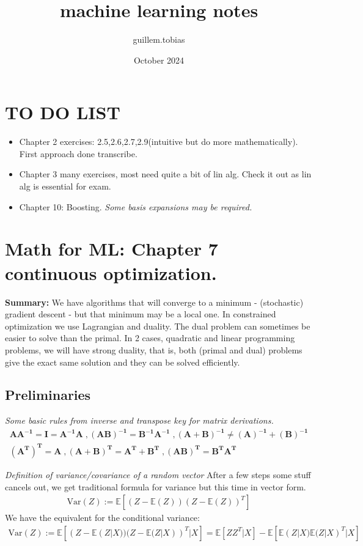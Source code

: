 \documentclass{article}
\begin{document}
\title{machine learning notes}
\author{guillem.tobias }
\date{October 2024}


\maketitle
\section{TO DO LIST}
\begin{itemize}
    \item Chapter 2 exercises: 2.5,2.6,2.7,2.9(intuitive but do more mathematically). First approach done transcribe.
    \item Chapter 3 many exercises, most need quite a bit of lin alg. Check it out as lin alg is essential for exam. 
    \item Chapter 10: Boosting. \textit{Some basis expansions may be required.}
\end{itemize}

\section*{Math for ML: Chapter 7 continuous optimization.}
\textbf{Summary:} We have algorithms that will converge to a minimum - (stochastic) gradient descent - but that minimum may be a local one. 
In constrained optimization we use Lagrangian and duality. The dual problem can sometimes be easier to solve than the primal. 
In 2 cases, quadratic and linear programming problems, we will have strong duality, that is, both (primal and dual) problems give 
the exact same solution and they can be solved efficiently.  

\subsection*{Preliminaries}
\textit{Some basic rules from inverse and transpose key for matrix derivations.}
\begin{align*}
\mathbf{A A^{-1} = I = A^{-1} A \;, (AB)^{-1} = B^{-1}A^{-1} \;, (A + B)^{-1} \neq (A)^{-1} + (B)^{-1}}
\\
\mathbf{(A^T)^T = A \;, (A+B)^T = A^T + B^T \;,(AB)^T = B^T A^T}
\end{align*}

\textit{Definition of variance/covariance of a random vector}
After a few steps some stuff cancels out, we get traditional formula for variance
but this time in vector form.
\begin{align*}
\text{Var}(Z) := \mathbb{E}[(Z - \mathbb{E}(Z) )(Z - \mathbb{E}(Z))^T] 
\end{align*}
We have the equivalent for the conditional variance: 
\begin{align*}
    \text{Var}(Z) := \mathbb{E}[(Z - \mathbb{E}(Z|X) )(Z - \mathbb{E}(Z|X))^T|X]
    = \mathbb{E}[ZZ^T|X] - \mathbb{E}[\mathbb{E}(Z|X)\mathbb{E}(Z|X)^T|X]
\end{align*}
\end{document}
